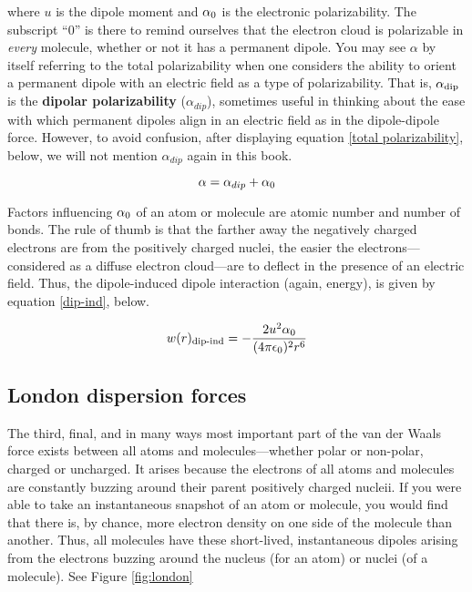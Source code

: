     where $u$ is the dipole moment and $\alpha\textsubscript{0}$ is the electronic polarizability. The subscript ``0'' is there to remind ourselves that the electron cloud is polarizable in \textit{every} molecule, whether or not it has a permanent dipole. You may see $\alpha$ by itself referring to the total polarizability when one considers the ability to orient a permanent dipole with an electric field as a type of polarizability. That is, $\alpha\textsubscript{dip}$ is the \textbf{dipolar polarizability} ($\alpha_{dip}$), sometimes useful in thinking about the ease with which permanent dipoles align in an electric field as in the dipole-dipole force. However, to avoid confusion, after displaying equation \ref{total polarizability}, below, we will not mention $\alpha_{dip}$ again in this book.

    \begin{equation}
    \label{total polarizability}
        \alpha = \alpha_{dip} + \alpha\textsubscript{0}
    \end{equation}

    Factors influencing $\alpha\textsubscript{0}$ of an atom or molecule are atomic number and number of bonds. The rule of thumb is that the farther away the negatively charged electrons are from the positively charged nuclei, the easier the electrons---considered as a diffuse electron cloud---are to deflect in the presence of an electric field. Thus, the dipole-induced dipole interaction (again, energy), is given by equation \ref{dip-ind}, below.

    \begin{equation}
    \label{dip-ind}
        w(r)\textsubscript{dip-ind}=-\frac{2u^{2}\alpha\textsubscript{0}}{(4\pi\epsilon\textsubscript{0})^{2}r^{6}}
    \end{equation}

    \subsection{London dispersion forces} 

    The third, final, and in many ways most important part of the van der Waals force exists between all atoms and molecules---whether polar or non-polar, charged or uncharged. It arises because the electrons of all atoms and molecules are constantly buzzing around their parent positively charged nucleii. If you were able to take an instantaneous snapshot of an atom or molecule, you would find that there is, by chance, more electron density on one side of the molecule than another. Thus, all molecules have these short-lived, instantaneous dipoles arising from the electrons buzzing around the nucleus (for an atom) or nuclei (of a molecule). See Figure \ref{fig:london}

